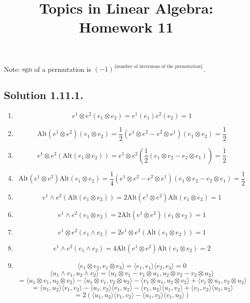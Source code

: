\documentclass{article}
\title{Topics in Linear Algebra: Homework 11}
\begin{document}
\maketitle
Note: $\mathrm{sgn}$ of a permutation is $(-1) ^\text{\{number of inversions of the permutation\}} $.
\subsection*{Solution 1.11.1.}
\begin{enumerate}
    \item 
    \[e^1 \otimes e^2(e_1\otimes e_2) = e^1(e_1)e^2(e_2)=1\]
    \item 
    \[\mathrm{Alt}(e^1\otimes e^2) (e_1\otimes e_2) = \frac{1}{2}(e^1\otimes e^2 - e^2\otimes e^1)(e_1\otimes e_2) = \frac{1}{2}\]
    \item
    \[e^1\otimes e^2 (\mathrm{Alt}(e_1\otimes e_2)) = e^1\otimes e^2(\frac{1}{2}(e_1\otimes e_2 - e_2\otimes e_1)) = \frac{1}{2}\]
    \item
    \[\mathrm{Alt}(e^1\otimes e^2)\mathrm{Alt}(e_1\otimes e_2) = \frac{1}{4}(e^1\otimes e^2 - e^2 \otimes e^1)(e_1\otimes e_2 - e_2\otimes e_1) = \frac{1}{2}\]
    \item 
    \[e^1\wedge e^2 (\mathrm{Alt}(e_1\otimes e_2)) = 2\mathrm{Alt}(e^1\otimes e^2)\mathrm{Alt}(e_1\otimes e_2) = 1\]
    \item 
    \[e^1\wedge e^2(e_1\otimes e_2) = 2\mathrm{Alt}(e^1\otimes e^2) (e_1\otimes e_2) = 1\]
    \item
    \[e^1\otimes e^2 (e_1 \wedge e_2) = 2e^1\otimes e^2 (\mathrm{Alt}(e_1\otimes e_2)) = 1\]
    \item
    \[e^1 \wedge e^2 (e_1\wedge e_2) = 4\mathrm{Alt}(e^1\otimes e^2)\mathrm{Alt}(e_1\otimes e_2) = 2\]
    \item 
    \[\langle e_1\otimes e_2, e_1\otimes e_3 \rangle = \langle e_1,e_1\rangle \langle e_2,e_3\rangle = 0\]
    \[\langle u_1 \wedge v_1, u_2 \wedge v_2\rangle = \langle u_1 \otimes v_1 - v_1 \otimes u_1, u_2 \otimes v_2 - v_2 \otimes u_2\rangle\]
    \[=\langle u_1\otimes v_1, u_2\otimes v_2\rangle - \langle u_1\otimes v_1, v_2\otimes u_2\rangle - \langle v_1\otimes u_1, u_2\otimes v_2\rangle + \langle v_1\otimes u_1, v_2\otimes u_2\rangle \]
    \[=\langle u_1, u_2\rangle\langle v_1,v_2\rangle - \langle u_1, v_2\rangle\langle v_1,u_2\rangle - \langle v_1, u_2\rangle\langle u_1,v_2\rangle+\langle v_1, v_2\rangle\langle u_1,u_2\rangle\]
    \[=2(\langle u_1, u_2\rangle\langle v_1,v_2\rangle - \langle u_1, v_2\rangle\langle v_1,u_2\rangle)\]

\end{enumerate}
\end{document}
